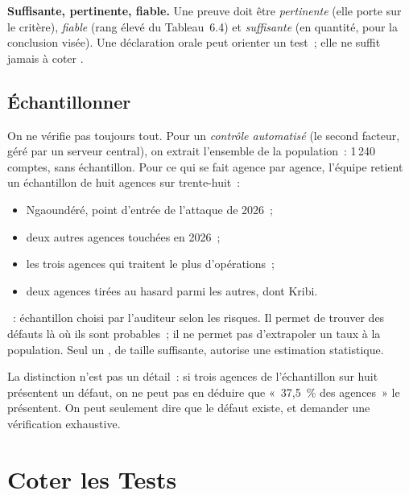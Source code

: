 \begin{boxinfo}
\textbf{Suffisante, pertinente, fiable.} Une preuve doit être
\emph{pertinente} (elle porte sur le critère), \emph{fiable} (rang élevé
du Tableau~6.4) et \emph{suffisante} (en quantité, pour la conclusion
visée). Une déclaration orale peut orienter un test~; elle ne suffit
jamais à coter \OUI{}.
\end{boxinfo}

\subsection{Échantillonner}

On ne vérifie pas toujours tout. Pour un \emph{contrôle automatisé} (le
second facteur, géré par un serveur central), on extrait l'ensemble de la
population~: 1\,240 comptes, sans échantillon. Pour ce qui se fait agence
par agence, l'équipe retient un échantillon de huit agences sur
trente-huit~:
\begin{itemize}
    \item Ngaoundéré, point d'entrée de l'attaque de 2026~;
    \item deux autres agences touchées en 2026~;
    \item les trois agences qui traitent le plus d'opérations~;
    \item deux agences tirées au hasard parmi les autres, dont Kribi.
\end{itemize}

\begin{boxdef}
~: échantillon
choisi par l'auditeur selon les risques. Il permet de trouver des défauts
là où ils sont probables~; il ne permet pas d'extrapoler un taux à la
population. Seul un , de taille suffisante,
autorise une estimation statistique.
\end{boxdef}

La distinction n'est pas un détail~: si trois agences de l'échantillon sur
huit présentent un défaut, on ne peut pas en déduire que «~37,5~\% des
agences~» le présentent. On peut seulement dire que le défaut existe, et
demander une vérification exhaustive.

\section{Coter les Tests}
\label{sec:c06-coter}

